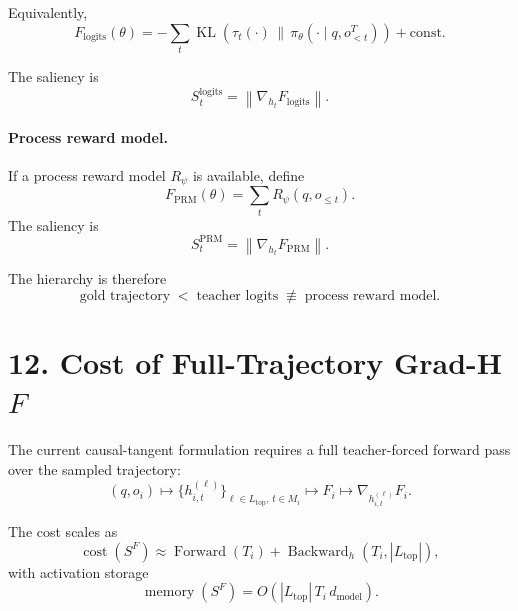 \documentclass[11pt]{article}
\begin{document}
Equivalently,
\begin{equation}
  F_{\mathrm{logits}}(\theta)
  =
  -
  \sum_t
  \operatorname{KL}
  \left(
    \tau_t(\cdot)
    \,\|\, 
    \pi_\theta(\cdot \mid q,o^T_{<t})
  \right)
  + \mathrm{const}.
\end{equation}

The saliency is
\begin{equation}
  S^{\mathrm{logits}}_t
  =
  \left\|
    \nabla_{h_t} F_{\mathrm{logits}}
  \right\|.
\end{equation}

\paragraph{Process reward model.}
If a process reward model $R_\psi$ is available, define
\begin{equation}
  F_{\mathrm{PRM}}(\theta)
  =
  \sum_t
  R_\psi(q,o_{\le t}).
\end{equation}
The saliency is
\begin{equation}
  S^{\mathrm{PRM}}_t
  =
  \left\|
    \nabla_{h_t} F_{\mathrm{PRM}}
  \right\|.
\end{equation}

The hierarchy is therefore
\begin{equation}
  \text{gold trajectory}
  \;<\;
  \text{teacher logits}
  \;\not\equiv\;
  \text{process reward model}.
\end{equation}

\section*{12. Cost of Full-Trajectory Grad-H $F$}

The current causal-tangent formulation requires a full teacher-forced forward
pass over the sampled trajectory:
\begin{equation}
  (q,o_i)
  \longmapsto
  \{h^{(\ell)}_{i,t}\}_{\ell \in L_{\mathrm{top}},\, t \in M_i}
  \longmapsto
  F_i
  \longmapsto
  \nabla_{h^{(\ell)}_{i,t}} F_i.
\end{equation}

The cost scales as
\begin{equation}
  \operatorname{cost}
  \left(
    S^F
  \right)
  \approx
  \operatorname{Forward}(T_i)
  +
  \operatorname{Backward}_{h}(T_i, |L_{\mathrm{top}}|),
\end{equation}
with activation storage
\begin{equation}
  \operatorname{memory}
  \left(
    S^F
  \right)
  =
  O
  \left(
    |L_{\mathrm{top}}| \, T_i \, d_{\mathrm{model}}
  \right).
\end{equation}
\end{document}
